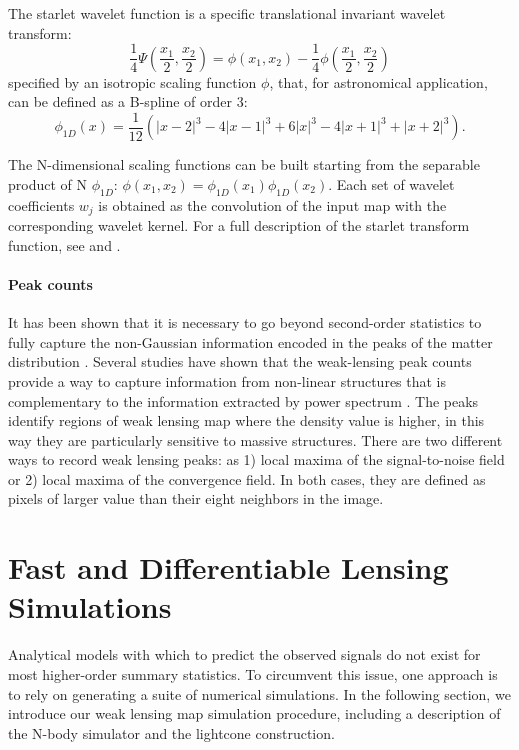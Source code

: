 \documentclass{aa}
\begin{document}
The starlet wavelet function is a specific translational invariant wavelet transform:
\begin{equation}
   \frac{1}{4} \Psi \left ( \frac{x_1}{2}, \frac{x_2}{2} \right )=
    \phi (x_1,x_2)- \frac{1}{4} \phi  \left ( \frac{x_1}{2},  \frac{x_2}{2} \right )
\end{equation}
specified by an isotropic scaling function $\phi$, that,  for astronomical application, can be defined as a B-spline of order 3:
\begin{equation}
\phi_{1D}(x)= \frac{1}{12} (|x-2|^3-4|x-1|^3+6|x|^3-4|x+1|^3+|x+2|^3 ).
\end{equation}

The N-dimensional scaling functions can be built starting from the separable product of N $\phi_{1D}$: $\phi(x_1,x_2)=\phi_{1D}(x_1)\phi_{1D}(x_2)$. 
Each set of wavelet coefficients $w_j$ is obtained as the convolution of the input map with the corresponding wavelet kernel. For a full description of the starlet transform function, see \citet{4060954} and \citet{10.5555/1830428}.

\paragraph{Peak counts}It has been shown that it is necessary to go beyond second-order statistics to fully capture the non-Gaussian information encoded in the peaks of the matter distribution 
\citep{1997A&A...322....1B, 1997ApJ...484..560J,1999A&A...342...15V,2003A&A...397..809S}. Several studies have shown that the weak-lensing peak counts provide a way to capture information from non-linear structures that is complementary to the information extracted by power spectrum \citep{lin2015new, peel2017cosmological, ajani2020constraining, harnois2021cosmic, zurcher2022dark}.
The peaks identify regions of weak lensing map where the density value is higher, in this way they are particularly sensitive to massive structures.
There are two different ways to record weak lensing peaks: as 1) local maxima of the signal-to-noise field or 2) local maxima of the convergence field. In both cases, they are defined as pixels of larger value than their eight neighbors in the image.


\section{Fast and Differentiable Lensing Simulations}\label{Fast_and_Differentiable_Lensing_Simulations}
Analytical models with which to predict the observed signals do not exist for most higher-order summary statistics. 
To circumvent this issue, one approach is to rely on generating a suite of numerical simulations.
In the following section, we introduce our weak lensing map simulation procedure, including a description of the N-body simulator and the lightcone construction.
\end{document}
